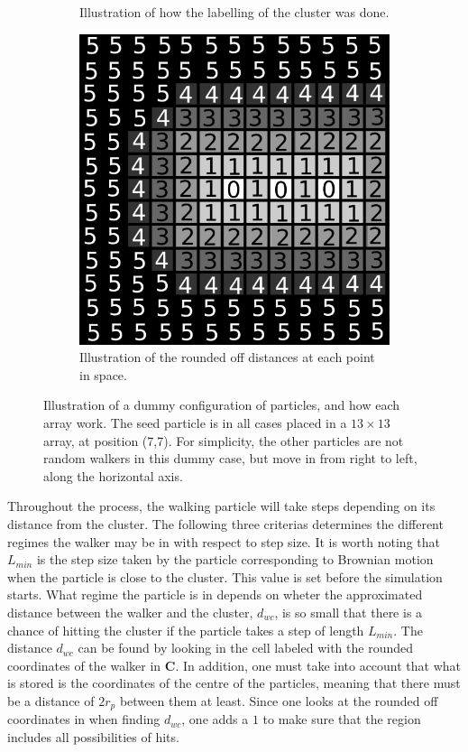 \begin{figure}[h]
\begin{center}
\begin{subfigure}[t]{0.3\textwidth}
			\caption{Illustration of how the labelling of the cluster was done. }
			\label{fig:B_array}
		\end{subfigure}
		\begin{subfigure}[t]{0.3\textwidth}
			\includegraphics[width = \textwidth]{fig/C_array.png}
			\caption{Illustration of the rounded off distances at each point in space.  }
			\label{fig:C_array}
		\end{subfigure}
		\caption{Illustration of a dummy configuration of particles, and how each array work. The seed particle is in all cases placed in a $13 \times 13$ array, at position (7,7). For simplicity, the other particles are not random walkers in this dummy case, but move in from right to left, along the horizontal axis.}
		\label{fig:arrays}
	\end{center}
\end{figure}

Throughout the process, the walking particle will take steps depending on its distance from the cluster. The following three criterias determines the different regimes the walker may be in with respect to step size. It is worth noting that $L_{min}$ is the step size taken by the particle corresponding to Brownian motion when the particle is close to the cluster. This value is set before the simulation starts. What regime the particle is in depends on wheter the approximated distance between the walker and the cluster, $d_{wc}$, is so small that there is a chance of hitting the cluster if the particle takes a step of length $L_{min}$. The distance $d_{wc}$ can be found by looking in the cell labeled with the rounded coordinates of the walker in $\textbf{C}$. In addition, one must take into account that what is stored is the coordinates of the centre of the particles, meaning that there must be a distance of $2r_p$ between them at least. Since one looks at the rounded off coordinates in when finding $d_{wc}$, one adds a $1$ to make sure that the region includes all possibilities of hits.


